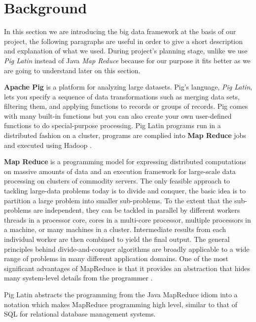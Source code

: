 \section{Background}
In this section we are introducing the big data framework at the basis of our project, the following paragraphs are useful in order to give a short description and explanation of what we used.  
During project's planning stage, unlike \cite{ddos_forensics} we use \textit{Pig Latin} instead of Java \textit{Map Reduce} because for our purpose it fits better as we are going to understand later on this section. 

\textbf{Apache Pig} is a platform for analyzing large datasets. Pig's language, \textit{Pig Latin}, lets you specify a sequence of data transformations such as merging data sets, filtering them, and applying functions to records or groups of records. Pig comes with many built-in functions but you can also create your own user-defined functions to do special-purpose processing.
Pig Latin programs run in a distributed fashion on a cluster, programs are complied into \textbf{Map Reduce} jobs and executed using Hadoop \cite{pig_wiki}.

\textbf{Map Reduce} is a programming model for expressing distributed computations on massive amounts of data and an execution framework for large-scale data processing on clusters of commodity servers. The only feasible approach to tackling large-data problems today is to divide and conquer, the basic idea is to partition a large problem into smaller sub-problems. To the extent that the sub-problems are independent, they can be tackled in parallel by different workers  threads in a processor core, cores in a multi-core processor, multiple processors in a machine, or many machines in a cluster. Intermediate results from each individual worker are then combined to yield the final output.
The general principles behind divide-and-conquer algorithms are broadly applicable to a wide range of problems in many different application domains. One of the most significant advantages of MapReduce is that it provides an abstraction that hides many system-level details from the programmer \cite{jimmy_lin}.

Pig Latin abstracts the programming from the Java MapReduce idiom into a notation which makes MapReduce programming high level, similar to that of SQL for relational database management systems.